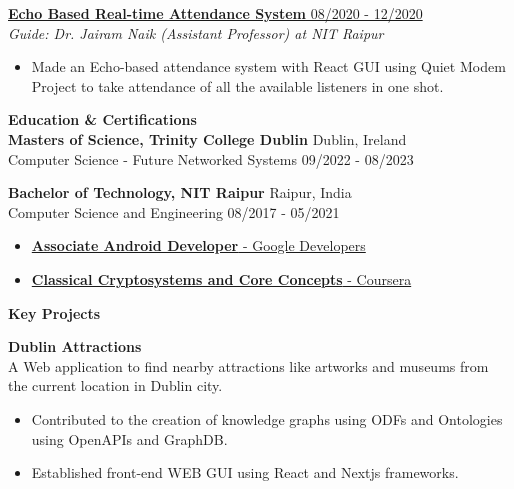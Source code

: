 \documentclass{article}
\begin{document}
\noindent \normalsize \href{https://dx.doi.org/10.1504/ijiids.2022.10044370}{\textbf{Echo Based Real-time Attendance System} \hfill 08/2020 - 12/2020} \\
\textit{Guide: Dr. Jairam Naik (Assistant Professor) at NIT Raipur}
\begin{itemize}
    \item  Made an Echo-based attendance system with React GUI using Quiet Modem Project to take attendance of all the available listeners in one shot.
\end{itemize}
\noindent \large \textbf{\textcolor{NavyBlue}{Education \& Certifications}} \vspace{3pt} \\
\normalsize \textbf{Masters of Science, Trinity College Dublin} \hfill Dublin, Ireland\\
Computer Science - Future Networked Systems \hfill 09/2022 - 08/2023
\vspace{3pt}

\noindent \normalsize \textbf{Bachelor of Technology, NIT Raipur} \hfill Raipur, India \\
Computer Science and Engineering \hfill 08/2017 - 05/2021
\vspace{3pt}

\begin{itemize}[noitemsep,nolistsep,leftmargin=*]
    \item { \normalsize \href{https://www.credential.net/623b189c-719c-4845-b489-1b1618d4da79}{\textbf{Associate Android Developer} - Google Developers } }
    \item { \normalsize \href{https://www.coursera.org/account/accomplishments/certificate/X4CNCJXC335V}{\textbf{Classical Cryptosystems and Core Concepts} - Coursera} }
\end{itemize}
\vspace{3pt}
\noindent \large \textbf{\textcolor{NavyBlue}{Key Projects}} \vspace{3pt}

\noindent \normalsize \textbf{Dublin Attractions} \\
\noindent \normalsize A Web application to find nearby attractions like artworks and museums from the current location in Dublin city.
\begin{itemize}
    \item Contributed to the creation of knowledge graphs using ODFs and Ontologies using OpenAPIs and GraphDB. 
    \item Established front-end WEB GUI using React and Nextjs frameworks.
\end{itemize}
\vspace{3pt}
\end{document}
